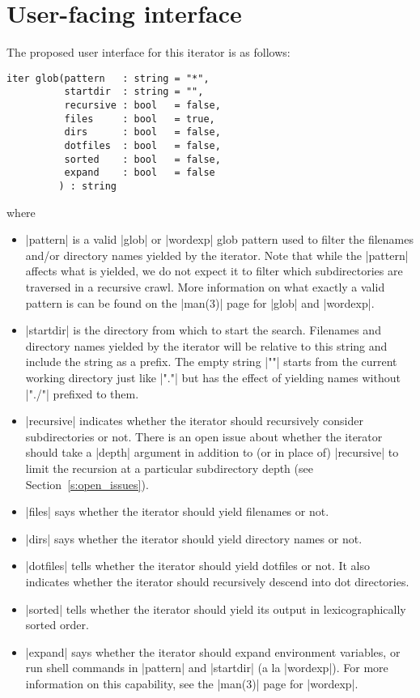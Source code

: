 \documentclass{article}
\begin{document}
\section{User-facing interface}
The proposed user interface for this iterator is as follows:
\begin{lstlisting}
iter glob(pattern   : string = "*",
          startdir  : string = "",
          recursive : bool   = false,
          files     : bool   = true,
          dirs      : bool   = false,
          dotfiles  : bool   = false,
          sorted    : bool   = false,
          expand    : bool   = false
         ) : string
\end{lstlisting}
where
\begin{itemize}
\item |pattern| is a valid |glob| or |wordexp| glob pattern used to
  filter the filenames and/or directory names yielded by the iterator.
  Note that while the |pattern| affects what is yielded, we do not
  expect it to filter which subdirectories are traversed in a
  recursive crawl. More information on what exactly a valid pattern is
  can be found on the |man(3)| page for |glob| and |wordexp|.

\item |startdir| is the directory from which to start the search.
  Filenames and directory names yielded by the iterator will be
  relative to this string and include the string as a prefix.  The
  empty string |""| starts from the current working directory just
  like |"."| but has the effect of yielding names without |"./"|
  prefixed to them.

\item |recursive| indicates whether the iterator should recursively
  consider subdirectories or not.  There is an open issue about
  whether the iterator should take a |depth| argument in addition to
  (or in place of) |recursive| to limit the recursion at a particular
  subdirectory depth (see Section~\ref{s:open_issues}).

\item |files| says whether the iterator should yield filenames or not.

\item |dirs| says whether the iterator should yield directory names or not.

\item |dotfiles| tells whether the iterator should yield dotfiles or
  not.  It also indicates whether the iterator should recursively
  descend into dot directories.

\item |sorted| tells whether the iterator should yield its output in
  lexicographically sorted order.

\item |expand| says whether the iterator should expand environment
  variables, or run shell commands in |pattern| and |startdir| (a la
  |wordexp|). For more information on this capability, see the
  |man(3)| page for |wordexp|.

\end{itemize}
\end{document}
